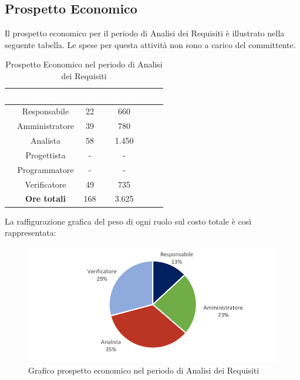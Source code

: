 \subsection{Prospetto Economico}
Il prospetto economico per il periodo di Analisi dei Requisiti è illustrato nella seguente tabella.
Le spese per questa attività non sono a carico del committente.

\begin{table}[ht]
	\begin{center}
			\begin{tabular}{cccccc}
			\rowcolor{coolblack}
			\hline
			&\textcolor{white}{Ruolo}&	\textcolor{white}{Ore} &\textcolor{white}{Costo(\euro)} \\
			\hline
			&Responsabile           &22& 660  \\
			&Amministratore        & 39& 780 \\
			&Analista                   & 58& 1.450 \\
			&Progettista              &  -& - \\
			&Programmatore       & - & -  \\
			&Verificatore             & 49 & 735 \\
			\hline
			&\textbf{Ore totali}    &168& 3.625 \\
		\end{tabular}
		\caption{Prospetto Economico nel periodo di Analisi dei Requisiti}
	\end{center}
\end{table}

La raffigurazione grafica del peso di ogni ruolo sul costo totale è così rappresentata:
\begin{figure}[!ht]
	\centering
	\includegraphics{images/grafoProspettoEconomico.png}
	\caption{Grafico prospetto economico nel periodo di Analisi dei Requisiti }
\end{figure}

